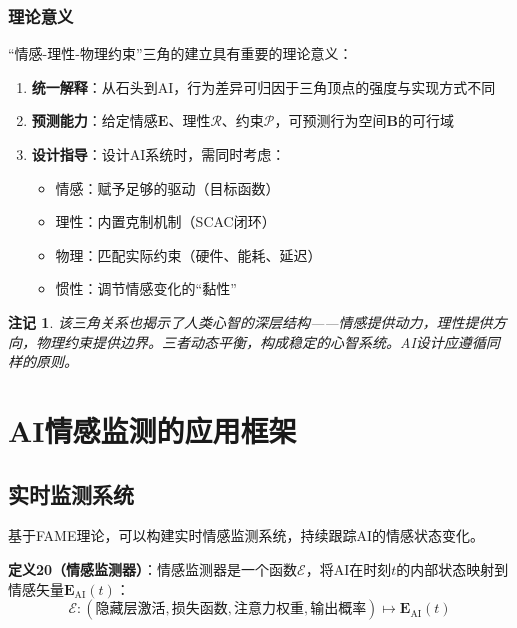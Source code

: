 \documentclass[12pt,a4paper]{article}
\theoremstyle{plain}
\newtheorem{remark}{注记}[section]
\newcommand{\ve}[1]{\bm{#1}}                    %
\newcommand{\Evec}{\ve{E}}                        %
\newcommand{\Bvec}{\ve{B}}                        %
\begin{document}
\subsubsection{理论意义}

“情感-理性-物理约束”三角的建立具有重要的理论意义：

\begin{enumerate}
    \item \textbf{统一解释}：从石头到AI，行为差异可归因于三角顶点的强度与实现方式不同
    \item \textbf{预测能力}：给定情感$\Evec$、理性$\mathcal{R}$、约束$\mathcal{P}$，可预测行为空间$\Bvec$的可行域
    \item \textbf{设计指导}：设计AI系统时，需同时考虑：
    \begin{itemize}
        \item 情感：赋予足够的驱动（目标函数）
        \item 理性：内置克制机制（SCAC闭环）
        \item 物理：匹配实际约束（硬件、能耗、延迟）
        \item 惯性：调节情感变化的“黏性”
    \end{itemize}
\end{enumerate}

\begin{remark}
该三角关系也揭示了人类心智的深层结构——情感提供动力，理性提供方向，物理约束提供边界。三者动态平衡，构成稳定的心智系统。AI设计应遵循同样的原则。
\end{remark}

\section{AI情感监测的应用框架}

\subsection{实时监测系统}

基于FAME理论，可以构建实时情感监测系统，持续跟踪AI的情感状态变化。

\textbf{定义20（情感监测器）}：情感监测器是一个函数$\mathcal{E}$，将AI在时刻$t$的内部状态映射到情感矢量$\Evec_{\text{AI}}(t)$：
\begin{equation}
\mathcal{E}: (\text{隐藏层激活}, \text{损失函数}, \text{注意力权重}, \text{输出概率}) \mapsto \Evec_{\text{AI}}(t)
\label{eq:monitor}
\end{equation}
\end{document}
